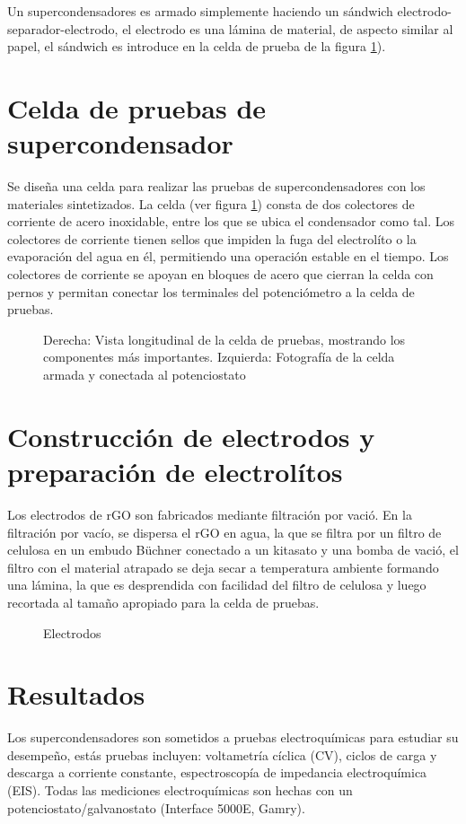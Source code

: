 Un supercondensadores es armado simplemente haciendo un sándwich electrodo-separador-electrodo, el electrodo es una lámina de material, de aspecto similar al papel, el sándwich es introduce en la celda de prueba de la figura \ref{fig:celda_de_pruebas_SC}). 

\section{Celda de pruebas de supercondensador}
Se diseña una celda para realizar las pruebas de supercondensadores con los materiales sintetizados. La celda (ver figura \ref{fig:celda_de_pruebas_SC}) consta de dos colectores de corriente de acero inoxidable, entre los que se ubica el condensador como tal. Los colectores de corriente tienen sellos que impiden la fuga del electrolíto o la evaporación del agua en él, permitiendo una operación estable en el tiempo. Los colectores de corriente se apoyan en bloques de acero que cierran la celda con pernos y permitan conectar los terminales del potenciómetro a la celda de pruebas.

\begin{figure}[h!]
	\centering
	\caption{Derecha: Vista longitudinal de la celda de pruebas, mostrando los componentes más importantes. Izquierda: Fotografía de la celda armada y conectada al potenciostato }
	\label{fig:celda_de_pruebas_SC}
\end{figure}

\section{Construcción de electrodos y preparación de electrolítos}
Los electrodos de rGO son fabricados mediante filtración por vació. En la filtración por vacío, se dispersa el rGO en agua, la que se filtra por un filtro de celulosa en un embudo Büchner conectado a un kitasato y una bomba de vació, el filtro con el material atrapado se deja secar a temperatura ambiente formando una lámina, la que es desprendida con facilidad del filtro de celulosa y luego recortada al tamaño apropiado para la celda de pruebas.

\begin{figure}
	\centering
	\caption{Electrodos}
	\label{fig:electrodes}
\end{figure}

\section{Resultados}
Los supercondensadores son sometidos a pruebas electroquímicas para estudiar su desempeño, estás pruebas incluyen: voltametría cíclica (CV), ciclos de carga y descarga a corriente constante, espectroscopía de impedancia electroquímica (EIS). Todas las mediciones electroquímicas son hechas con un potenciostato/galvanostato (Interface 5000E, Gamry).
